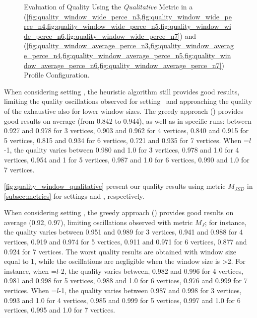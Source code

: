 \begin{figure}[H]
\begin{adjustbox}{minipage=\linewidth,scale=0.75}
    \caption{Evaluation of Quality Using the \emph{Qualitative} Metric in a \wide (\cref{fig:quality_window_wide_perce_n3,fig:quality_window_wide_perce_n4,fig:quality_window_wide_perce_n5,fig:quality_window_wide_perce_n6,fig:quality_window_wide_perce_n7}) and \average (\cref{fig:quality_window_average_perce_n3,fig:quality_window_average_perce_n4,fig:quality_window_average_perce_n5,fig:quality_window_average_perce_n6,fig:quality_window_average_perce_n7}) Profile Configuration.}  \label{fig:quality_window_perce}
  \end{adjustbox}
  \end{figure}

  When considering setting \average, the heuristic algorithm still provides good results, limiting the quality oscillations observed for setting \wide\ and approaching the quality of the exhaustive also for lower window sizes. The greedy approach () provides good results on average (from 0.842 to 0.944), as well as in specific runs: between 0.927 and 0.978 for 3 vertices, 0.903 and 0.962 for 4 vertices, 0.840 and 0.915 for 5 vertices, 0.815 and 0.934 for 6 vertices, 0.721 and 0.935 for 7 vertices.
  When \windowsize=$l$-1, the quality varies between 0.980 and 1.0 for 3 vertices, 0.978 and 1.0 for 4 vertices, 0.954 and 1 for 5 vertices, 0.987 and 1.0 for 6 vertices, 0.990 and 1.0 for 7 vertices.

  \cref{fig:quality_window_qualitative} present our quality results using metric $M_{JSD}$ in \cref{subsec:metrics} for settings \wide and \average, respectively.

  When considering setting \wide, the greedy approach () provides good results on average (0.92, 0.97), limiting oscillations observed with metric $M_J$; for instance, the quality varies between 0.951 and 0.989 for 3 vertices, 0.941 and 0.988 for 4 vertices, 0.919 and 0.974 for 5 vertices, 0.911 and 0.971 for 6 vertices, 0.877 and 0.924 for 7 vertices.
  The worst quality results are obtained with window size equal to 1, while the oscillations are negligible when the window size is >2. For instance, when \windowsize=$l$-2, the quality varies between, 0.982 and 0.996 for 4 vertices, 0.981 and 0.998 for 5 vertices, 0.988 and 1.0 for 6 vertices, 0.976 and 0.999 for 7 vertices. When \windowsize=$l$-1, the quality varies between  0.987 and  0.998 for 3 vertices, 0.993 and 1.0 for 4 vertices, 0.985 and 0.999 for 5 vertices, 0.997 and 1.0 for 6 vertices, 0.995 and 1.0  for 7 vertices.


